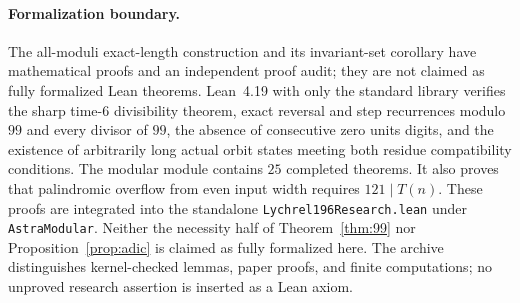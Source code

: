 \paragraph{Formalization boundary.}
The all-moduli exact-length construction and its invariant-set corollary
have mathematical proofs and an independent proof audit; they are not
claimed as fully formalized Lean theorems. Lean~4.19 with only the standard
library verifies the sharp time-$6$ divisibility theorem, exact reversal
and step recurrences modulo $99$ and every divisor of $99$, the absence
of consecutive zero units digits, and the existence of arbitrarily long
actual orbit states meeting both residue compatibility conditions.
The modular module contains $25$ completed theorems. It also proves that
palindromic overflow from even input width requires $121\mid T(n)$.
These proofs are integrated into the standalone
\texttt{Lychrel196Research.lean} under \texttt{AstraModular}.
Neither the necessity half of Theorem~\ref{thm:99} nor
Proposition~\ref{prop:adic} is claimed as fully formalized here.
The archive distinguishes kernel-checked lemmas, paper proofs, and finite
computations; no unproved research assertion is inserted as a Lean axiom.
